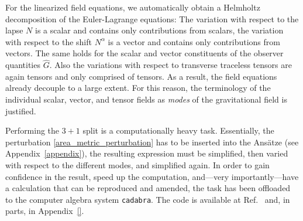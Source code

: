 For the linearized field equations, we automatically obtain a Helmholtz decomposition of the Euler-Lagrange equations: The variation with respect to the lapse $N$ is a scalar and contains only contributions from scalars, the variation with respect to the shift $N^\alpha$ is a vector and contains only contributions from vectors. The same holds for the scalar and vector constituents of the observer quantities $\hat G$. Also the variations with respect to transverse traceless tensors are again tensors and only comprised of tensors. As a result, the field equations already decouple to a large extent. For this reason, the terminology of the individual scalar, vector, and tensor fields as \emph{modes} of the gravitational field is justified.

Performing the $3+1$ split is a computationally heavy task. Essentially, the perturbation \eqref{area_metric_perturbation} has to be inserted into the Ansätze (see Appendix~\ref{appendix}), the resulting expression must be simplified, then varied with respect to the different modes, and simplified again. In order to gain confidence in the result, speed up the computation, and---very importantly---have a calculation that can be reproduced and amended, the task has been offloaded to the computer algebra system \texttt{cadabra}\cite{Peeters2007,Peeters_2018}. The code is available at Ref.~\cite{Alex_2020_area-metric-gravity} and, in parts, in Appendix~\ref{}.

